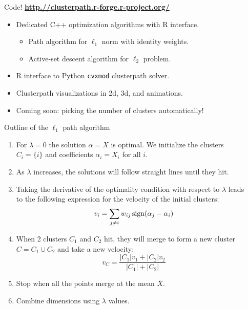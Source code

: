 \documentclass[final]{beamer}
\begin{document}
\begin{frame}{}
\begin{columns}[T]
\begin{column}{0.315\linewidth}
\end{column}\hfill
\begin{column}{0.315\linewidth}
\begin{alertblock}{Code!
    \textbf{\url{http.//clusterpath.r-forge.r-project.org/}}}
\begin{itemize}
\item Dedicated C++ optimization algorithms with R interface.
  \begin{itemize}
  \item Path algorithm for $\ell_1$ norm with identity weights.
  \item Active-set descent algorithm for $\ell_2$ problem.
  \end{itemize}
\item R interface to Python \texttt{cvxmod} clusterpath solver.
\item Clusterpath visualizations in 2d, 3d, and animations.
\item Coming soon: picking the number of clusters automatically!
\end{itemize}
\end{alertblock}


\begin{block}{Outline of the $\ell_1$ path algorithm}
\begin{enumerate}
\item For $\lambda=0$ the solution $\alpha=X$ is optimal. We
  initialize the clusters $C_i = \{i\}$ and coefficients $\alpha_i =
  X_i$ for all $i$.
\item As $\lambda$ increases, the solutions will follow straight
  lines until they hit.
\item Taking the derivative of the optimality condition with respect
  to $\lambda$ leads to the following expression for the velocity of
  the initial clusters:
$$v_i = \sum_{j\neq i}w_{ij}\operatorname{sign}(\alpha_j-\alpha_i)$$
\item When 2 clusters $C_1$ and $C_2$ hit, they will merge to form a
  new cluster $C = C_1\cup C_2$ and take a new velocity:
$$v_C = \frac{
|C_1|v_1 + |C_2|v_2
}{
|C_1|+|C_2|
}$$
\item Stop when all the points merge at the mean $\bar X$.
\item Combine dimensions using $\lambda$ values.
\end{enumerate}


\end{block}


\end{column}
\end{columns}
\end{frame}
\end{document}

